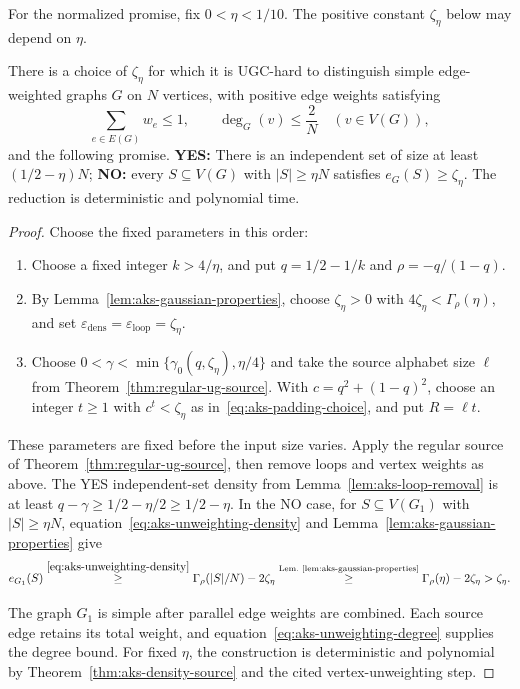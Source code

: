 For the normalized promise, fix $0<\eta<1/10$.
The positive constant $\zeta_\eta$ below may depend on $\eta$.

\begin{lemma}
\label{lem:normalized-density-source}
There is a choice of $\zeta_\eta$ for which it is UGC-hard to
distinguish simple edge-weighted graphs $G$ on $N$
vertices, with positive edge weights satisfying
\[
 \sum_{e\in E(G)}w_e\le1,\qquad
 \deg_G(v)\le\frac2N\quad(v\in V(G)),
\]
and the following promise.
\textbf{YES:} There is an independent set of size at least $(1/2-\eta)N$;
\textbf{NO:} every $S\subseteq V(G)$ with $|S|\ge\eta N$ satisfies
$e_G(S)\ge\zeta_\eta$.
The reduction is deterministic and polynomial time.
\end{lemma}

\begin{proof}
Choose the fixed parameters in this order:
\begin{enumerate}
\item Choose a fixed integer $k>4/\eta$, and put
 $q=1/2-1/k$ and $\rho=-q/(1-q)$.
\item By Lemma~\ref{lem:aks-gaussian-properties}, choose $\zeta_\eta>0$ with
 $4\zeta_\eta<\Gamma_\rho(\eta)$,
 and set $\varepsilon_{\mathrm{dens}}=\varepsilon_{\mathrm{loop}}=\zeta_\eta$.
\item Choose $0<\gamma<\min\{\gamma_0(q,\zeta_\eta),\eta/4\}$ and take the
 source alphabet size $\ell$ from Theorem~\ref{thm:regular-ug-source}.
 With $c=q^2+(1-q)^2$, choose an integer $t\ge1$ with $c^t<\zeta_\eta$
 as in~\eqref{eq:aks-padding-choice}, and put $R=\ell t$.
\end{enumerate}
These parameters are fixed before the input size varies.
Apply the regular source of Theorem~\ref{thm:regular-ug-source},
then remove loops and vertex weights as above.
The YES independent-set density from Lemma~\ref{lem:aks-loop-removal} is at least
$q-\gamma\geq1/2-\eta/2\geq1/2-\eta$.
In the NO case, for $S\subseteq V(G_1)$ with $|S|\geq\eta N$,
equation~\eqref{eq:aks-unweighting-density} and
Lemma~\ref{lem:aks-gaussian-properties} give
\[
e_{G_1}(S)\overset{\eqref{eq:aks-unweighting-density}}{\geq}
 \Gamma_\rho(|S|/N)-2\zeta_\eta
 \overset{\text{Lem.~\ref{lem:aks-gaussian-properties}}}{\geq}
 \Gamma_\rho(\eta)-2\zeta_\eta>\zeta_\eta.
\]

The graph $G_1$ is simple after parallel edge weights are combined.
Each source edge retains its total weight, and
equation~\eqref{eq:aks-unweighting-degree} supplies the degree bound.
For fixed $\eta$, the construction is deterministic and polynomial
by Theorem~\ref{thm:aks-density-source} and the cited
vertex-unweighting step.
\end{proof}

